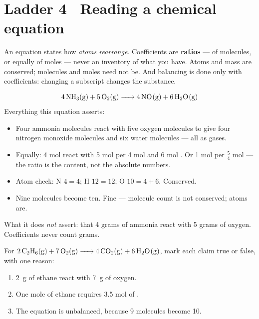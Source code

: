 \documentclass{apchem-worksheet}
\begin{document}
\section*{\sffamily Ladder 4 \textbullet\ Reading a chemical equation}

An equation states how \emph{atoms rearrange}. Coefficients are
\textbf{ratios} --- of molecules, or equally of moles --- never an
inventory of what you have. Atoms and mass are conserved; molecules and
moles need not be. And balancing is done only with coefficients: changing
a subscript changes the substance.

\begin{workedexample}
\[ \ce{4NH3(g) + 5O2(g) -> 4NO(g) + 6H2O(g)} \]
Everything this equation asserts:
\begin{itemize}[leftmargin=*,itemsep=0.15em]
  \item Four ammonia molecules react with five oxygen molecules to give
        four nitrogen monoxide molecules and six water molecules --- all
        as gases.
  \item Equally: 4 mol  react with 5 mol  per 4 mol 
        and 6 mol . Or 1 mol  per $\tfrac{5}{4}$ mol
         --- the ratio is the content, not the absolute numbers.
  \item Atom check: N $4 = 4$; H $12 = 12$; O $10 = 4 + 6$. Conserved.
  \item Nine molecules become ten. Fine --- molecule count is not
        conserved; atoms are.
\end{itemize}
What it does \emph{not} assert: that 4 grams of ammonia react with 5 grams
of oxygen. Coefficients never count grams.
\end{workedexample}

\begin{yourturn}
For $\ce{2C2H6(g) + 7O2(g) -> 4CO2(g) + 6H2O(g)}$, mark each claim true or
false, with one reason:
\begin{enumerate}[leftmargin=*,itemsep=0.3em]
  \item \SI{2}{\gram} of ethane react with \SI{7}{\gram} of oxygen.
  \item One mole of ethane requires 3.5 mol of .
  \item The equation is unbalanced, because 9 molecules become 10.
\end{enumerate}
\end{yourturn}
\end{document}
